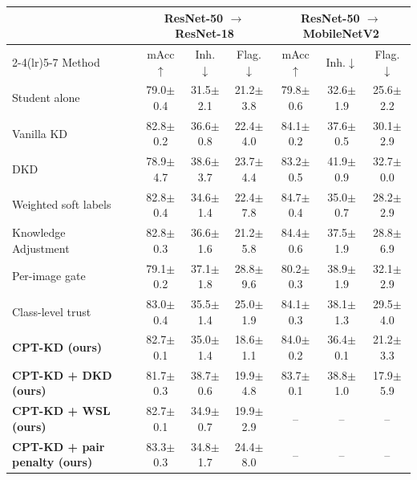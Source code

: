 \begin{tabular}{l ccc ccc}
\toprule
 & \multicolumn{3}{c}{ResNet-50 $\to$ ResNet-18} & \multicolumn{3}{c}{ResNet-50 $\to$ MobileNetV2} \\
\cmidrule(lr){2-4}\cmidrule(lr){5-7}
Method & mAcc$\uparrow$ & Inh.$\downarrow$ & Flag.$\downarrow$ & mAcc$\uparrow$ & Inh.$\downarrow$ & Flag.$\downarrow$ \\
\midrule
Student alone & 79.0{\scriptsize$\pm$0.4} & 31.5{\scriptsize$\pm$2.1} & 21.2{\scriptsize$\pm$3.8} & 79.8{\scriptsize$\pm$0.6} & 32.6{\scriptsize$\pm$1.9} & 25.6{\scriptsize$\pm$2.2} \\
Vanilla KD~\cite{hinton2015distilling} & 82.8{\scriptsize$\pm$0.2} & 36.6{\scriptsize$\pm$0.8} & 22.4{\scriptsize$\pm$4.0} & 84.1{\scriptsize$\pm$0.2} & 37.6{\scriptsize$\pm$0.5} & 30.1{\scriptsize$\pm$2.9} \\
DKD~\cite{zhao2022dkd} & 78.9{\scriptsize$\pm$4.7} & 38.6{\scriptsize$\pm$3.7} & 23.7{\scriptsize$\pm$4.4} & 83.2{\scriptsize$\pm$0.5} & 41.9{\scriptsize$\pm$0.9} & 32.7{\scriptsize$\pm$0.0} \\
Weighted soft labels~\cite{zhou2021wsl} & 82.8{\scriptsize$\pm$0.4} & 34.6{\scriptsize$\pm$1.4} & 22.4{\scriptsize$\pm$7.8} & 84.7{\scriptsize$\pm$0.4} & 35.0{\scriptsize$\pm$0.7} & 28.2{\scriptsize$\pm$2.9} \\
Knowledge Adjustment~\cite{wen2021preparing} & 82.8{\scriptsize$\pm$0.3} & 36.6{\scriptsize$\pm$1.6} & 21.2{\scriptsize$\pm$5.8} & 84.4{\scriptsize$\pm$0.6} & 37.5{\scriptsize$\pm$1.9} & 28.8{\scriptsize$\pm$6.9} \\
Per-image gate~\cite{mishra2026correctness} & 79.1{\scriptsize$\pm$0.2} & 37.1{\scriptsize$\pm$1.8} & 28.8{\scriptsize$\pm$9.6} & 80.2{\scriptsize$\pm$0.3} & 38.9{\scriptsize$\pm$1.9} & 32.1{\scriptsize$\pm$2.9} \\
Class-level trust~\cite{lukasik2022teacherspet} & 83.0{\scriptsize$\pm$0.4} & 35.5{\scriptsize$\pm$1.4} & 25.0{\scriptsize$\pm$1.9} & 84.1{\scriptsize$\pm$0.3} & 38.1{\scriptsize$\pm$1.3} & 29.5{\scriptsize$\pm$4.0} \\
\midrule
\textbf{CPT-KD (ours)} & 82.7{\scriptsize$\pm$0.1} & 35.0{\scriptsize$\pm$1.4} & 18.6{\scriptsize$\pm$1.1} & 84.0{\scriptsize$\pm$0.2} & 36.4{\scriptsize$\pm$0.1} & 21.2{\scriptsize$\pm$3.3} \\
\textbf{CPT-KD + DKD (ours)} & 81.7{\scriptsize$\pm$0.3} & 38.7{\scriptsize$\pm$0.6} & 19.9{\scriptsize$\pm$4.8} & 83.7{\scriptsize$\pm$0.1} & 38.8{\scriptsize$\pm$1.0} & 17.9{\scriptsize$\pm$5.9} \\
\textbf{CPT-KD + WSL (ours)} & 82.7{\scriptsize$\pm$0.1} & 34.9{\scriptsize$\pm$0.7} & 19.9{\scriptsize$\pm$2.9} & -- & -- & -- \\
\textbf{CPT-KD + pair penalty (ours)} & 83.3{\scriptsize$\pm$0.3} & 34.8{\scriptsize$\pm$1.7} & 24.4{\scriptsize$\pm$8.0} & -- & -- & -- \\
\bottomrule
\end{tabular}

